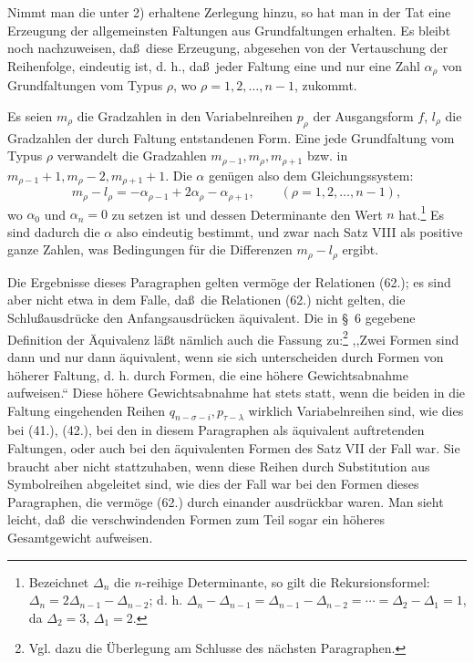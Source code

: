 \documentclass[11pt]{article}
\begin{document}
Nimmt man die unter 2) erhaltene Zerlegung hinzu, so hat man in der Tat eine Erzeugung der allgemeinsten Faltungen aus Grundfaltungen erhalten. Es bleibt noch nachzuweisen, da\ss\ diese Erzeugung, abgesehen von der Vertauschung der Reihenfolge, eindeutig ist, d. h., da\ss\ jeder Faltung eine und nur eine Zahl $\alpha_\rho$ von Grundfaltungen vom Typus $\rho$, wo $\rho=1,2,\ldots,n-1$, zukommt.

Es seien $m_\rho$ die Gradzahlen in den Variabelnreihen $p_\rho$ der Ausgangsform $f$, $l_\rho$ die Gradzahlen der durch Faltung entstandenen Form. Eine jede Grundfaltung vom Typus $\rho$ verwandelt die Gradzahlen $m_{\rho-1},m_\rho,m_{\rho+1}$ bzw. in $m_{\rho-1}+1,m_\rho-2,m_{\rho+1}+1$. Die $\alpha$ gen\"ugen also dem Gleichungssystem:
\begin{equation}
 m_\rho-l_\rho=-\alpha_{\rho-1}+2\alpha_\rho-\alpha_{\rho+1},
 \qquad (\rho=1,2,\ldots,n-1),
\tag{70}
\end{equation}
wo $\alpha_0$ und $\alpha_n=0$ zu setzen ist und dessen Determinante den Wert $n$ hat.\footnote{Bezeichnet $\Delta_n$ die $n$-reihige Determinante, so gilt die Rekursionsformel: $\Delta_n=2\Delta_{n-1}-\Delta_{n-2}$; d. h. $\Delta_n-\Delta_{n-1}=\Delta_{n-1}-\Delta_{n-2}=\cdots=\Delta_2-\Delta_1=1$, da $\Delta_2=3$, $\Delta_1=2$.} Es sind dadurch die $\alpha$ also eindeutig bestimmt, und zwar nach Satz VIII als positive ganze Zahlen, was Bedingungen f\"ur die Differenzen $m_\rho-l_\rho$ ergibt.

Die Ergebnisse dieses Paragraphen gelten verm\"oge der Relationen (62.); es sind aber nicht etwa in dem Falle, da\ss\ die Relationen (62.) nicht gelten, die Schlu\ss ausdr\"ucke den Anfangsausdr\"ucken \"aquivalent. Die in \S\ 6 gegebene Definition der \"Aquivalenz l\"a\ss t n\"amlich auch die Fassung zu:\footnote{Vgl. dazu die \"Uberlegung am Schlusse des n\"achsten Paragraphen.} ,,Zwei Formen sind dann und nur dann \"aquivalent, wenn sie sich unterscheiden durch Formen von h\"oherer Faltung, d. h. durch Formen, die eine h\"ohere Gewichtsabnahme aufweisen.`` Diese h\"ohere Gewichtsabnahme hat stets statt, wenn die beiden in die Faltung eingehenden Reihen $q_{n-\sigma-i},p_{\tau-\lambda}$ wirklich Variabelnreihen sind, wie dies bei (41.), (42.), bei den in diesem Paragraphen als \"aquivalent auftretenden Faltungen, oder auch bei den \"aquivalenten Formen des Satz VII der Fall war. Sie braucht aber nicht stattzuhaben, wenn diese Reihen durch Substitution aus Symbolreihen abgeleitet sind, wie dies der Fall war bei den Formen dieses Paragraphen, die verm\"oge (62.) durch einander ausdr\"uckbar waren. Man sieht leicht, da\ss\ die verschwindenden Formen zum Teil sogar ein h\"oheres Gesamtgewicht aufweisen.
\end{document}
